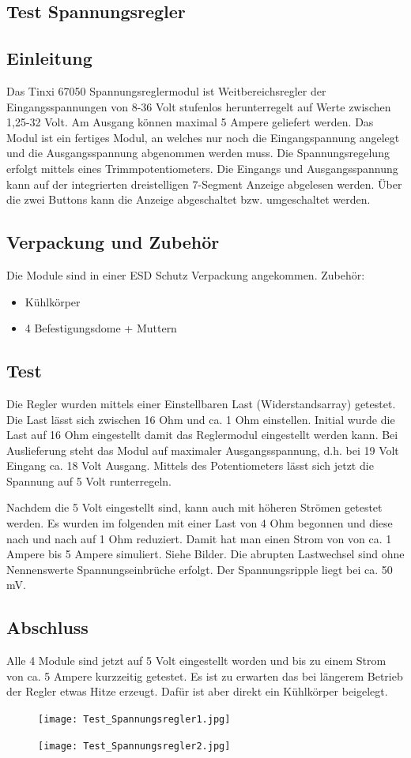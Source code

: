 \documentclass[a4paper, 12pt, titlepage]{scrartcl}
\begin{document}
{\begin{appendices}
\section{Test Spannungsregler}
\subsection*{Einleitung}
Das Tinxi 67050 Spannungsreglermodul ist Weitbereichsregler der Eingangsspannungen von 8-36 Volt stufenlos herunterregelt auf Werte zwischen 1,25-32 Volt.  
Am Ausgang können maximal 5 Ampere geliefert werden.  
Das Modul ist ein fertiges Modul, an welches nur noch die Eingangspannung angelegt und die Ausgangsspannung abgenommen werden muss.  
Die Spannungsregelung erfolgt mittels eines Trimmpotentiometers.
Die Eingangs und Ausgangsspannung kann auf der integrierten dreistelligen 7-Segment Anzeige abgelesen werden. Über die zwei Buttons kann die Anzeige abgeschaltet bzw. umgeschaltet werden.
\subsection*{Verpackung und Zubehör}
Die Module sind in einer ESD Schutz Verpackung angekommen.
Zubehör:
\begin{itemize}
\item Kühlkörper
\item 4 Befestigungsdome + Muttern
\end{itemize}
\subsection*{Test}
Die Regler wurden mittels einer Einstellbaren Last (Widerstandsarray) getestet.
Die Last lässt sich zwischen 16 Ohm und ca. 1 Ohm einstellen.
Initial wurde die Last auf 16 Ohm eingestellt damit das Reglermodul eingestellt werden kann.
Bei Auslieferung steht das Modul auf maximaler Ausgangsspannung, d.h. bei 19 Volt Eingang ca. 18 Volt Ausgang.
Mittels des Potentiometers lässt sich jetzt die Spannung auf 5 Volt runterregeln.

Nachdem die 5 Volt eingestellt sind, kann auch mit höheren Strömen getestet werden.
Es wurden im folgenden mit einer Last von 4 Ohm begonnen und diese nach und nach auf 1 Ohm reduziert.
Damit hat man einen Strom von von ca. 1 Ampere bis 5 Ampere simuliert. Siehe Bilder.
Die abrupten Lastwechsel sind ohne Nennenswerte Spannungseinbrüche erfolgt.
Der Spannungsripple liegt bei ca. 50 mV.
\subsection*{Abschluss}
Alle 4 Module sind jetzt auf 5 Volt eingestellt worden und bis zu einem Strom von ca. 5 Ampere kurzzeitig getestet.
Es ist zu erwarten das bei längerem Betrieb der Regler etwas Hitze erzeugt. Dafür ist aber direkt ein Kühlkörper beigelegt. 
\begin{figure}[h!]
\centering
\texttt{[image: Test\_Spannungsregler1.jpg]}
\end{figure}
\begin{figure}[h!]
\centering
\texttt{[image: Test\_Spannungsregler2.jpg]}
\end{figure}

\end{appendices}}
\end{document}
